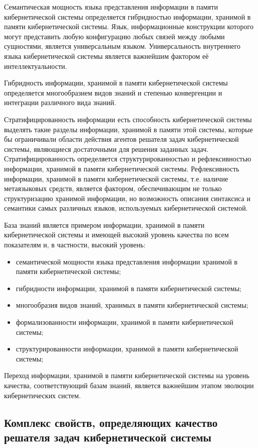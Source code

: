 Семантическая мощность языка представления информации в памяти кибернетической системы определяется гибридностью информации, хранимой в памяти кибернетической системы.
Язык, информационные конструкции которого могут представить любую конфигурацию любых связей между любыми сущностями, является универсальным языком.
Универсальность внутреннего языка кибернетической системы является важнейшим фактором её интеллектуальности.

Гибридность информации, хранимой в памяти кибернетической системы определяется многообразием видов знаний и степенью конвергенции и интеграции различного вида знаний.

Стратифицированность информации есть способность кибернетической системы выделять такие разделы информации, хранимой в памяти этой системы, которые бы ограничивали области действия агентов решателя задач кибернетической системы, являющиеся достаточными для решения заданных задач.
Стратифицированность определяется структурированностью и рефлексивностью информации, хранимой в памяти кибернетической системы.
Рефлексивность информации, хранимой в памяти кибернетической системы, т.е. наличие метаязыковых средств, является фактором, обеспечивающим не только структуризацию хранимой информации, но возможность описания синтаксиса и семантики самых различных языков, используемых кибернетической системой.

База знаний является примером информации, хранимой в памяти кибернетической системы и имеющей высокий уровень качества по всем показателям и, в частности, высокий уровень:
\begin{itemize}
    \item{семантической мощности языка представления информации хранимой в памяти кибернетической
системы;}
    \item{гибридности информации, хранимой в памяти кибернетической системы;}
    \item{многообразия видов знаний, хранимых в памяти кибернетической системы;}
    \item{формализованности информации, хранимой в памяти кибернетической системы;}
    \item{структурированности информации, хранимой в памяти кибернетической системы;}
\end{itemize}

Переход информации, хранимой в памяти кибернетической системы на уровень качества, соответствующий базам знаний, является важнейшим этапом эволюции кибернетических систем.


\subsection{Комплекс свойств, определяющих качество решателя задач кибернетической системы}

